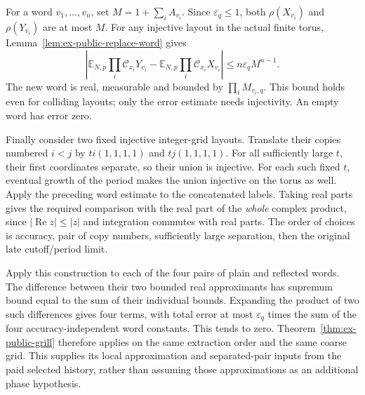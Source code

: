 For a word $v_1,\ldots,v_n$, set $M=1+\sum_i A_{v_i}$. Since
$\varepsilon_q\leq1$, both $\rho(X_{v_i})$ and $\rho(Y_{v_i})$ are at
most $M$. For any injective layout in the actual finite torus,
Lemma~\ref{lem:ex-public-replace-word} gives
\[
 \left|\mathbb E_{N,p}\prod_i\mathcal C_{x_i}Y_{v_i}
        -\mathbb E_{N,p}\prod_i\mathcal C_{x_i}X_{v_i}\right|
                 \leq n\varepsilon_q M^{n-1}.
\]
The new word is real, measurable and bounded by $\prod_iM_{v_i,q}$.
This bound holds even for colliding layouts; only the error estimate needs
injectivity. An empty word has error zero.

Finally consider two fixed injective integer-grid layouts. Translate their
copies numbered $i<j$ by $ti(1,1,1,1)$ and $tj(1,1,1,1)$. For all
sufficiently large $t$, their first coordinates separate, so their union
is injective. For each such fixed $t$, eventual growth of the period
makes the union injective on the torus as well. Apply the preceding word
estimate to the concatenated labels. Taking real parts gives the required
comparison with the real part of the \emph{whole} complex product, since
$|\operatorname{Re}z|\leq|z|$ and integration commutes with real parts.
The order of choices is accuracy, pair of copy numbers, sufficiently large
separation, then the original late cutoff/period limit.

Apply this construction to each of the four pairs of plain and reflected
words. The difference between their two bounded real approximants has
supremum bound equal to the sum of their individual bounds. Expanding the
product of two such differences gives four terms, with total error at
most $\varepsilon_q$ times the sum of the four accuracy-independent
word constants. This tends to zero. Theorem~\ref{thm:ex-public-grill}
therefore applies on the same extraction order and the same coarse grid.
This supplies its local approximation and separated-pair inputs from the
paid selected history, rather than assuming those approximations as an
additional phase hypothesis.
